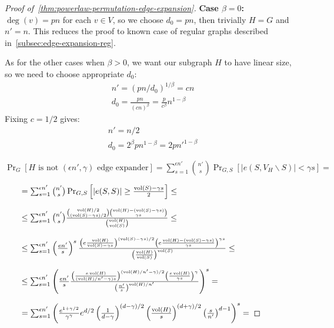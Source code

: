 \begin{proof}[Proof of~\autoref{thm:powerlaw-permutation-edge-expansion}]
    \textbf{Case $\beta=0$:}
    $\deg(v)=pn$ for each $v\in V$, so we choose $d_0=pn$, then trivially $H=G$ and $n'=n$.
    This reduces the proof to known case of regular graphs described in~\autoref{subsec:edge-expansion-reg}.
    
    As for the other cases when $\beta>0$, we want our subgraph $H$ to have linear size, so we need to choose appropriate $d_0$:
    \begin{gather*}
        n'=(pn/d_0)^{1/\beta}=cn\\
        d_0=\frac{pn}{(cn)^\beta}=\frac{p}{c^\beta}n^{1-\beta}
    \end{gather*}
    Fixing $c=1/2$ gives:
    \begin{gather*}
        n'=n/2\\
        d_0=2^\beta pn^{1-\beta}=2pn'^{1-\beta}
    \end{gather*}
    
    $\Pr_G[H\text{ is not }(\epsilon n',\gamma)\text{ edge expander}]
    =\sum_{s=1}^{\epsilon n'}{
        \binom{n'}{s}
        \Pr_{G,S}[|e(S,V_H\backslash S)| < \gamma s]
    }=$
    
    $\qquad=\sum_{s=1}^{\epsilon n'}{
        \binom{n'}{s}
        \Pr_{G,S}\left[|e(S,S)|\geq\frac{\operatorname*{vol}(S)-\gamma s}{2}\right]
    }\leq$
    
    $\qquad\leq\sum_{s=1}^{\epsilon n'}{
        \binom{n'}{s}
        \frac{\binom{\operatorname*{vol}(H)/2}{(\operatorname*{vol}(S)-\gamma s)/2}\binom{\operatorname*{vol}(H)-(\operatorname*{vol}(S)-\gamma s)}{\gamma s}}{\binom{\operatorname*{vol}(H)}{\operatorname*{vol}(S)}}
    }\leq$
    
    $\qquad\leq\sum_{s=1}^{\epsilon n'}{
        \left(\frac{en'}{s}\right)^s
        \frac{
            \left(e\frac{\operatorname*{vol}(H)}{\operatorname*{vol}(S)-\gamma s}\right)^{(\operatorname*{vol}(S)-\gamma s)/2}
            \left(e\frac{\operatorname*{vol}(H)-(\operatorname*{vol}(S)-\gamma s)}{\gamma s}\right)^{\gamma s}
        }
        {\left(\frac{\operatorname*{vol}(H)}{\operatorname*{vol}(S)}\right)^{\operatorname*{vol}(S)}}
    }\leq$
    
    $\qquad\leq\sum_{s=1}^{\epsilon n'}{\left(
        \frac{en'}{s}
        \frac{
            \left(\frac{e\operatorname*{vol}(H)}{(\operatorname*{vol}(H)/n'-\gamma)s}\right)^{(\operatorname*{vol}(H)/n'-\gamma)/2}
            \left(\frac{e\operatorname*{vol}(H)}{\gamma s}\right)^{\gamma}
        }
        {\left(\frac{n'}{s}\right)^{\operatorname*{vol}(H)/n'}}
    \right)^s}=$

    $\qquad=\sum_{s=1}^{\epsilon n'}{\left(
        \frac{e^{1+\gamma/2}}{\gamma^\gamma}
        e^{d/2}
        \left(\frac{1}{d-\gamma}\right)^{(d-\gamma)/2}
        \left(\frac{\operatorname*{vol}(H)}{s}\right)^{(d+\gamma)/2}
        \left(\frac{s}{n'}\right)^{d-1}
    \right)^s}=$


\end{proof}
